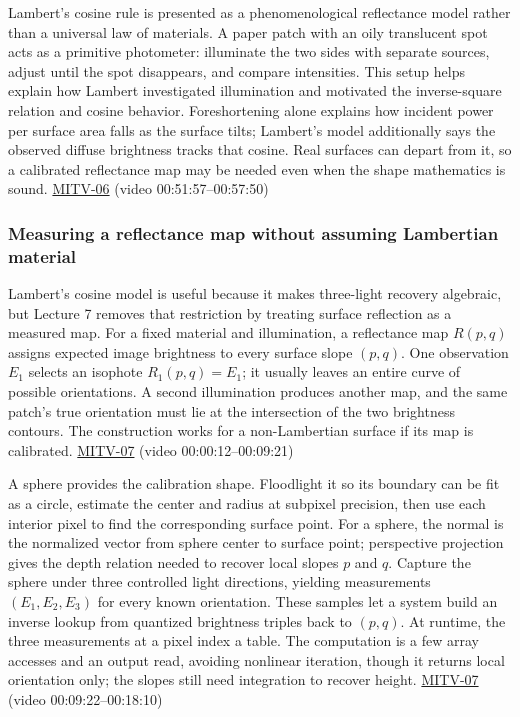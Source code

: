 Lambert's cosine rule is presented as a phenomenological reflectance model rather than a universal law of materials. A paper patch with an oily translucent spot acts as a primitive photometer: illuminate the two sides with separate sources, adjust until the spot disappears, and compare intensities. This setup helps explain how Lambert investigated illumination and motivated the inverse-square relation and cosine behavior. Foreshortening alone explains how incident power per surface area falls as the surface tilts; Lambert's model additionally says the observed diffuse brightness tracks that cosine. Real surfaces can depart from it, so a calibrated reflectance map may be needed even when the shape mathematics is sound. \hyperref[04-visual-computing-ii-ch036]{MITV-06} (video 00:51:57--00:57:50)

\subsubsection{Measuring a reflectance map without assuming Lambertian material}\label{measuring-a-reflectance-map-without-assuming-lambertian-material}

Lambert's cosine model is useful because it makes three-light recovery algebraic, but Lecture 7 removes that restriction by treating surface reflection as a measured map. For a fixed material and illumination, a reflectance map \(R(p,q)\) assigns expected image brightness to every surface slope \((p,q)\). One observation \(E_1\) selects an isophote \(R_1(p,q)=E_1\); it usually leaves an entire curve of possible orientations. A second illumination produces another map, and the same patch's true orientation must lie at the intersection of the two brightness contours. The construction works for a non-Lambertian surface if its map is calibrated. \hyperref[04-visual-computing-ii-ch036]{MITV-07} (video 00:00:12--00:09:21)

A sphere provides the calibration shape. Floodlight it so its boundary can be fit as a circle, estimate the center and radius at subpixel precision, then use each interior pixel to find the corresponding surface point. For a sphere, the normal is the normalized vector from sphere center to surface point; perspective projection gives the depth relation needed to recover local slopes \(p\) and \(q\). Capture the sphere under three controlled light directions, yielding measurements \((E_1,E_2,E_3)\) for every known orientation. These samples let a system build an inverse lookup from quantized brightness triples back to \((p,q)\). At runtime, the three measurements at a pixel index a table. The computation is a few array accesses and an output read, avoiding nonlinear iteration, though it returns local orientation only; the slopes still need integration to recover height. \hyperref[04-visual-computing-ii-ch036]{MITV-07} (video 00:09:22--00:18:10)

